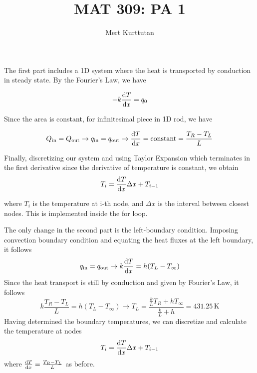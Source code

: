 \documentclass[11pt,a4paper]{article}
\title{MAT 309: PA 1}
\author{Mert Kurttutan}
\date{\vspace{-5ex}}
\numberwithin{equation}{section}
\newcommand{\subtit}[1]{\textbf{\noindent{\large #1}}}
\begin{document}
\maketitle
\subtit{Question 1}

\subtit{a)} The first part includes a 1D system where the heat is transported by conduction in steady state. By the Fourier's Law, we have

\begin{equation}
-k \dv{T}{x} = q_0
\end{equation}

Since the area is constant, for infinitesimal piece in 1D rod, we have

\begin{equation}
Q_{\text{in}} = Q_{\text{out}} \to q_{\text{in}} = q_{\text{out}} \to \dv{T}{x} = \text{constant} = \frac{T_R-T_L}{L}
\end{equation}

Finally, discretizing our system and using Taylor Expansion which terminates in the first derivative since the derivative of temperature is constant, we obtain
\begin{equation}
T_i = \dv{T}{x}\Delta x + T_{i-1}
\end{equation}

where $T_i$ is the temperature at i-th node, and $\Delta x$ is the interval between closest nodes. This is implemented inside the for loop.

\subtit{b)}The only change in the second part is the left-boundary condition. Imposing convection boundary condition and equating the heat fluxes at the left boundary, it follows
\begin{equation}
q_{\text{in}} = q_{\text{out}} \to k\dv{T}{x} = h(T_L-T_{\infty})
\end{equation}
Since the heat transport is still by conduction and given by Fourier's Law, it follows
\begin{equation}
k\frac{T_R-T_L}{L} = h(T_L-T_{\infty}) \to T_L = \frac{\frac{k}{L}T_R  + h T_{\infty}}{\frac{k}{L} + h } = 431.25\, \text{K}
\end{equation}
Having determined the boundary temperatures, we can discretize and calculate the temperature at nodes
\begin{equation}
T_i = \dv{T}{x}\Delta x + T_{i-1}
\end{equation}
where $\dv{T}{x} = \frac{T_R-T_L}{L}$ as before. 
\end{document}
